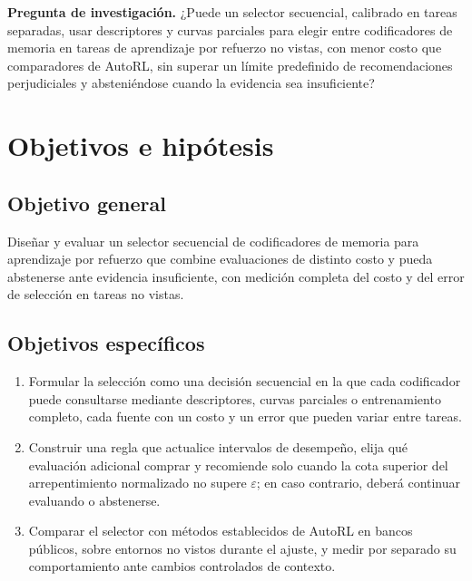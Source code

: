 \documentclass[11pt,letterpaper]{article}
\begin{document}
\begin{tcolorbox}[colback=soft,colframe=sabana,boxrule=0.6pt,arc=1.2pt,left=6pt,right=6pt,top=5pt,bottom=5pt]
\textbf{Pregunta de investigación.}
¿Puede un selector secuencial, calibrado en tareas separadas, usar descriptores y curvas parciales para elegir entre codificadores de memoria en tareas de aprendizaje por refuerzo no vistas, con menor costo que comparadores de AutoRL, sin superar un límite predefinido de recomendaciones perjudiciales y absteniéndose cuando la evidencia sea insuficiente?
\end{tcolorbox}

\section{Objetivos e hipótesis}

\subsection{Objetivo general}

Diseñar y evaluar un selector secuencial de codificadores de memoria para aprendizaje por refuerzo que combine evaluaciones de distinto costo y pueda abstenerse ante evidencia insuficiente, con medición completa del costo y del error de selección en tareas no vistas.

\subsection{Objetivos específicos}

\begin{enumerate}
  \item Formular la selección como una decisión secuencial en la que cada codificador puede consultarse mediante descriptores, curvas parciales o entrenamiento completo, cada fuente con un costo y un error que pueden variar entre tareas.
  \item Construir una regla que actualice intervalos de desempeño, elija qué evaluación adicional comprar y recomiende solo cuando la cota superior del arrepentimiento normalizado no supere $\varepsilon$; en caso contrario, deberá continuar evaluando o abstenerse.
  \item Comparar el selector con métodos establecidos de AutoRL en bancos públicos, sobre entornos no vistos durante el ajuste, y medir por separado su comportamiento ante cambios controlados de contexto.
\end{enumerate}
\end{document}
